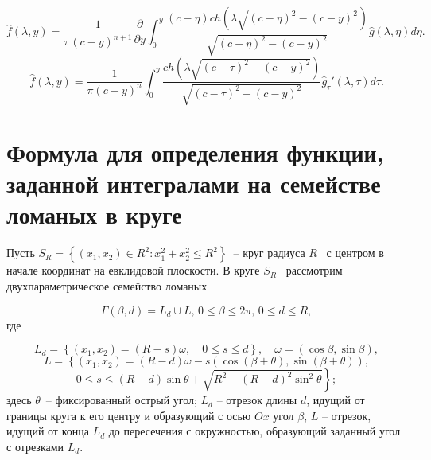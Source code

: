 \bigskip

\begin{equation*}
\widehat  f\left(\lambda ,y\right)=\frac 1{\pi \left(c-y\right)^{n+1}}\frac{{\partial}}{{\partial}y}\int
_0^y\frac{\left(c-\eta \right)\mathit{ch}\left(\lambda \sqrt{\left(c-\eta
		\right)^2-\left(c-y\right)^2}\right)}{\sqrt{\left(c-\eta \right)^2-\left(c-y\right)^2}}\widehat  g\left(\lambda ,\eta
\right)\mathit{d\eta }.
\end{equation*}
\begin{equation*}
\widehat  f\left(\lambda ,y\right)=\frac 1{\pi \left(c-y\right)^n}\int _0^y\frac{\mathit{ch}\left(\lambda
	\sqrt{\left(c-\tau \right)^2-\left(c-y\right)^2}\right)}{\sqrt{\left(c-\tau \right)^2-\left(c-y\right)^2}}\widehat
g_{\tau }'\left(\lambda ,\tau \right)d\tau .
\end{equation*}


\section{Формула для определения функции, заданной интегралами на семействе ломаных в круге}
Пусть  $S_R=\left\{\left(x_1,x_2\right){\in}R^2:x_1^2+x_2^2{\leq}R^2\right\}$\ – круг радиуса  $R$ \ с центром в
начале координат на евклидовой плоскости. В круге  $S_R$ \ рассмотрим двухпараметрическое семейство ломаных

\begin{equation*}
\Gamma \left(\beta ,d\right)=L_d{\cup}L, \, 0{\leq}\beta {\leq}2\pi , \, 0{\leq}d{\leq}R,
\end{equation*}
где

\begin{equation*}
L_d=\left\{\left(x_1,x_2\right)=\left(R-s\right)\omega ,\quad 0{\leq}s{\leq}d\right\},\quad \omega
=(\cos \beta ,\sin \beta ),
\end{equation*}
\begin{equation*}
L=\left\{\left(x_1,x_2\right)=\left(R-d\right)\omega - s\left(\cos \left(\beta +\theta \right),\sin \left(\beta +\theta
\right)\right),\right.
\end{equation*}
\begin{equation*}
\left.0{\leq}s{\leq}\left(R-d\right)\sin \theta +\sqrt{R^2-\left(R-d\right)^2\sin ^2\theta }\right\};
\end{equation*}
здесь  $\theta $\ -- фиксированный острый угол;
$L_d$ -- отрезок длины $d$, идущий от границы круга к его центру и образующий с осью $Ox$ угол $\beta$, $L$ -- отрезок,
идущий от конца $L_d$ до пересечения с окружностью, образующий заданный угол с отрезками $L_d$.

